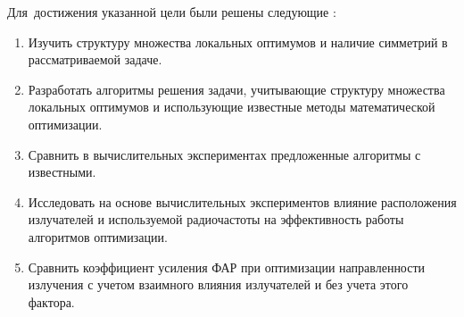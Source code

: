 Для~достижения указанной цели были решены следующие {\tasks}:
\begin{enumerate}[beginpenalty=10000] %
  \item Изучить структуру множества локальных оптимумов и наличие симметрий в рассматриваемой задаче.
  \item Разработать алгоритмы решения задачи, учитывающие структуру множества локальных оптимумов и использующие известные методы математической оптимизации.
  \item Сравнить в вычислительных экспериментах предложенные алгоритмы с известными.
  \item Исследовать на основе вычислительных экспериментов влияние расположения излучателей и используемой радиочастоты на эффективность работы алгоритмов оптимизации.
  \item Сравнить коэффициент усиления ФАР при оптимизации направленности излучения с учетом взаимного влияния излучателей и без учета этого фактора.
\end{enumerate}


{\novelty}


